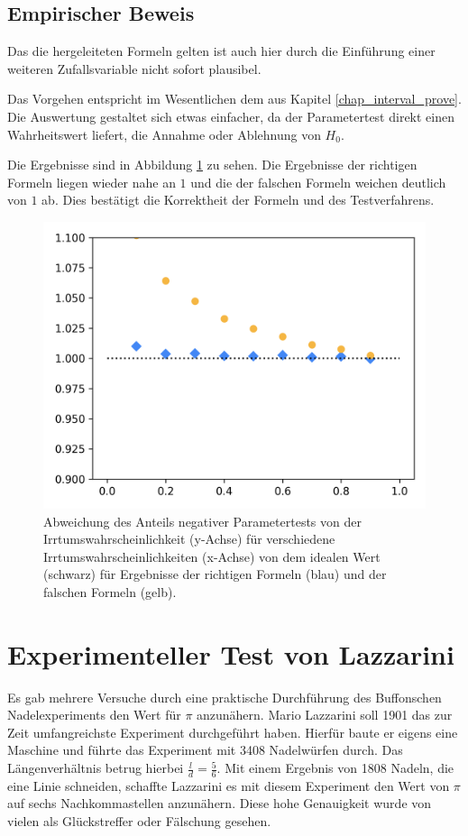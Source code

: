 \documentclass[10pt,twocolumn]{scrartcl}
\begin{document}
	\subsection{Empirischer Beweis}
		Das die hergeleiteten Formeln gelten ist auch hier durch die Einführung einer weiteren Zufallsvariable nicht sofort plausibel.

		Das Vorgehen entspricht im Wesentlichen dem aus Kapitel \ref{chap_interval_prove}. Die Auswertung gestaltet sich etwas einfacher, da der Parametertest direkt einen Wahrheitswert liefert, die Annahme oder Ablehnung von $H_0$.

		Die Ergebnisse sind in Abbildung \ref{fig_test_mean_dot} zu sehen. Die Ergebnisse der richtigen Formeln liegen wieder nahe an $1$ und die der falschen Formeln weichen deutlich von $1$ ab. Dies bestätigt die Korrektheit der Formeln und des Testverfahrens.

		\begin{figure}[H]
			\centering
			\includegraphics[width=0.9\columnwidth]{images/mean_test.png}
			\caption{Abweichung des Anteils negativer Parametertests von der Irrtumswahrscheinlichkeit (y-Achse) für verschiedene Irrtumswahrscheinlichkeiten (x-Achse) von dem idealen Wert (schwarz) für Ergebnisse der richtigen Formeln (blau) und der falschen Formeln (gelb).}
			\label{fig_test_mean_dot}
		\end{figure}

\section{Experimenteller Test von Lazzarini}
	Es gab mehrere Versuche durch eine praktische Durchführung des Buffonschen Nadelexperiments den Wert für $\pi$ anzunähern. Mario Lazzarini soll 1901 das zur Zeit umfangreichste Experiment durchgeführt haben. Hierfür baute er eigens eine Maschine und führte das Experiment mit 3408 Nadelwürfen durch. Das Längenverhältnis betrug hierbei ${\tfrac {l}{d}={\tfrac {5}{6}}}$. Mit einem Ergebnis von 1808 Nadeln, die eine Linie schneiden, schaffte Lazzarini es mit diesem Experiment den Wert von $\pi$ auf sechs Nachkommastellen anzunähern. Diese hohe Genauigkeit wurde von vielen als Glückstreffer oder Fälschung gesehen.\cite{Badger}
\end{document}
